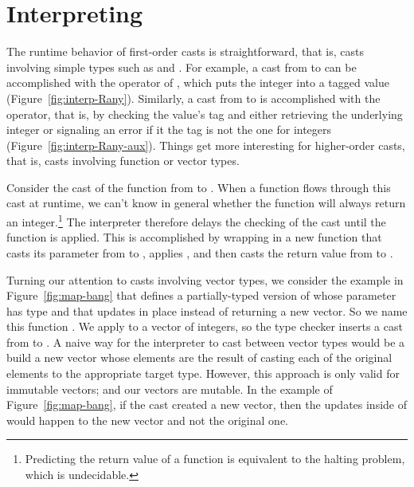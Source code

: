 \documentclass[7x10,nocrop]{TimesAPriori_MIT}%
\begin{document}
\clearpage

\section{Interpreting \LangCast{}}
\label{sec:interp-casts}

The runtime behavior of first-order casts is straightforward, that is,
casts involving simple types such as  and
.  For example, a cast from  to 
can be accomplished with the  operator of \LangAny{}, which
puts the integer into a tagged value
(Figure~\ref{fig:interp-Rany}). Similarly, a cast from  to
 is accomplished with the  operator, that
is, by checking the value's tag and either retrieving the underlying
integer or signaling an error if it the tag is not the one for
integers (Figure~\ref{fig:interp-Rany-aux}).
%
Things get more interesting for higher-order casts, that is, casts
involving function or vector types.

Consider the cast of the function  from  to . When a function flows through
this cast at runtime, we can't know in general whether the function
will always return an integer.\footnote{Predicting the return value of
  a function is equivalent to the halting problem, which is
  undecidable.}  The \LangCast{} interpreter therefore delays the checking
of the cast until the function is applied. This is accomplished by
wrapping  in a new function that casts its parameter
from  to , applies , and then
casts the return value from  to .

Turning our attention to casts involving vector types, we consider the
example in Figure~\ref{fig:map-bang} that defines a
partially-typed version of  whose parameter  has
type  and that updates  in place
instead of returning a new vector. So we name this function
. We apply  to a vector of integers, so
the type checker inserts a cast from 
to . A naive way for the \LangCast{} interpreter to
cast between vector types would be a build a new vector whose elements
are the result of casting each of the original elements to the
appropriate target type. However, this approach is only valid for
immutable vectors; and our vectors are mutable. In the example of
Figure~\ref{fig:map-bang}, if the cast created a new vector, then
the updates inside of  would happen to the new vector
and not the original one.
\end{document}
